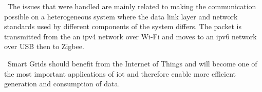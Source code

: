 \documentclass[conference]{IEEEtran}
\begin{document}
\
The issues that were handled are mainly related to making the communication possible on a heterogeneous system where the data link layer and network standards used by different components of the system differs. The packet is transmitted from the an \gls{ipv4} network over Wi-Fi and moves to an \gls{ipv6} network over USB then to Zigbee. 

\
Smart Grids should benefit from the Internet of Things and will become one of the most important applications of \gls{iot} and therefore enable more efficient generation and consumption of data.

\mbox{}
\nocite{*}
 

     
\end{document}
